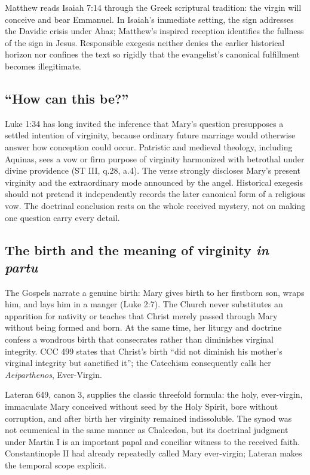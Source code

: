 Matthew reads Isaiah 7:14 through the Greek scriptural tradition: the virgin will conceive and bear Emmanuel. In Isaiah's immediate setting, the sign addresses the Davidic crisis under Ahaz; Matthew's inspired reception identifies the fullness of the sign in Jesus. Responsible exegesis neither denies the earlier historical horizon nor confines the text so rigidly that the evangelist's canonical fulfillment becomes illegitimate.

\subsection{``How can this be?''}

Luke 1:34 has long invited the inference that Mary's question presupposes a settled intention of virginity, because ordinary future marriage would otherwise answer how conception could occur. Patristic and medieval theology, including Aquinas, sees a vow or firm purpose of virginity harmonized with betrothal under divine providence (ST III, q.28, a.4). The verse strongly discloses Mary's present virginity and the extraordinary mode announced by the angel. Historical exegesis should not pretend it independently records the later canonical form of a religious vow. The doctrinal conclusion rests on the whole received mystery, not on making one question carry every detail.

\subsection{The birth and the meaning of virginity \emph{in partu}}

The Gospels narrate a genuine birth: Mary gives birth to her firstborn son, wraps him, and lays him in a manger (Luke 2:7). The Church never substitutes an apparition for nativity or teaches that Christ merely passed through Mary without being formed and born. At the same time, her liturgy and doctrine confess a wondrous birth that consecrates rather than diminishes virginal integrity. CCC 499 states that Christ's birth ``did not diminish his mother's virginal integrity but sanctified it''; the Catechism consequently calls her \emph{Aeiparthenos}, Ever-Virgin.

Lateran 649, canon 3, supplies the classic threefold formula: the holy, ever-virgin, immaculate Mary conceived without seed by the Holy Spirit, bore without corruption, and after birth her virginity remained indissoluble. The synod was not ecumenical in the same manner as Chalcedon, but its doctrinal judgment under Martin I is an important papal and conciliar witness to the received faith. Constantinople II had already repeatedly called Mary ever-virgin; Lateran makes the temporal scope explicit.


